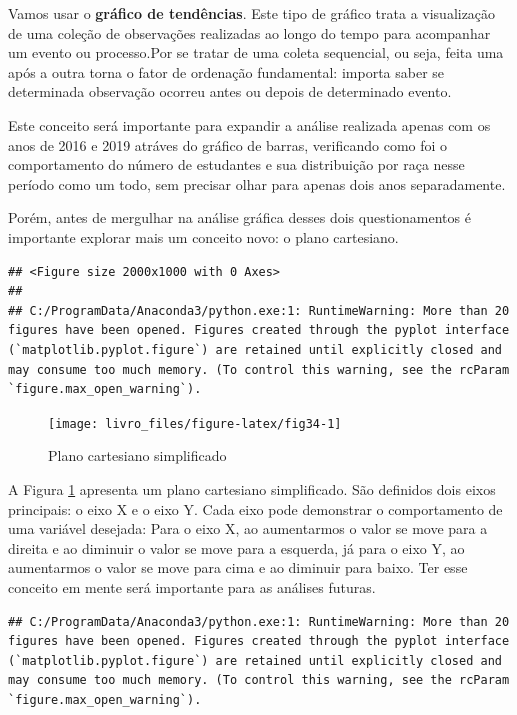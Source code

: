 \documentclass[
  oneside]{book}
\begin{document}
Vamos usar o \textbf{gráfico de tendências}. Este tipo de gráfico trata a visualização de uma coleção de observações realizadas ao longo do tempo para acompanhar um evento ou processo.Por se tratar de uma coleta sequencial, ou seja, feita uma após a outra torna o fator de ordenação fundamental: importa saber se determinada observação ocorreu antes ou depois de determinado evento.

Este conceito será importante para expandir a análise realizada apenas com os anos de 2016 e 2019 atráves do gráfico de barras, verificando como foi o comportamento do número de estudantes e sua distribuição por raça nesse período como um todo, sem precisar olhar para apenas dois anos separadamente.

Porém, antes de mergulhar na análise gráfica desses dois questionamentos é importante explorar mais um conceito novo: o plano cartesiano.

\begin{verbatim}
## <Figure size 2000x1000 with 0 Axes>
## 
## C:/ProgramData/Anaconda3/python.exe:1: RuntimeWarning: More than 20 figures have been opened. Figures created through the pyplot interface (`matplotlib.pyplot.figure`) are retained until explicitly closed and may consume too much memory. (To control this warning, see the rcParam `figure.max_open_warning`).
\end{verbatim}

\begin{figure}

{\centering \texttt{[image: livro\_files/figure-latex/fig34-1]} 

}

\caption{Plano cartesiano simplificado}\label{fig:fig34}
\end{figure}

A Figura \ref{fig:fig34} apresenta um plano cartesiano simplificado. São definidos dois eixos principais: o eixo X e o eixo Y. Cada eixo pode demonstrar o comportamento de uma variável desejada: Para o eixo X, ao aumentarmos o valor se move para a direita e ao diminuir o valor se move para a esquerda, já para o eixo Y, ao aumentarmos o valor se move para cima e ao diminuir para baixo. Ter esse conceito em mente será importante para as análises futuras.

\begin{verbatim}
## C:/ProgramData/Anaconda3/python.exe:1: RuntimeWarning: More than 20 figures have been opened. Figures created through the pyplot interface (`matplotlib.pyplot.figure`) are retained until explicitly closed and may consume too much memory. (To control this warning, see the rcParam `figure.max_open_warning`).
\end{verbatim}
\end{document}
